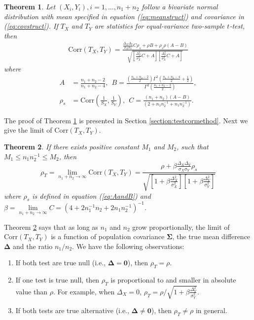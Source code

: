 \documentclass[12pt, a4paper]{article}
\newtheorem{theorem}{Theorem}       %
\newcommand{\cor}{\text{Corr}}
\begin{document}
	\begin{theorem}\label{thm:tstat}
		Let $(X_i, Y_i), i = 1, \ldots, n_1 + n_2$ follow a bivariate normal distribution with mean specified in equation (\ref{eq:meanstruct}) and covariance in (\ref{eq:covstruct}). If $T_X$ and $T_Y$ are statistics for equal-variance two-sample $t$-test, then 
		\begin{equation}\label{eq:ttestcor}
	\begin{aligned}
	 \cor(T_X, T_Y) =   
	 \frac{\frac{\Delta_X\Delta_Y}{\sigma_X\sigma_Y}C \rho_{s}+ \rho B
		+ \rho_{s}\rho(A-B)}{\sqrt{\left[ \frac{\Delta_X^2}{\sigma_X^2}C + A\right]\left[\frac{\Delta_Y^2}{\sigma_X^2}C +   A\right]}}
	\end{aligned}
		\end{equation}
	where 
			 \begin{equation}\label{eq:AandB}
			 	 \begin{aligned}
			 	 A & = \frac{n_1 + n_2-2}{n_1 + n_2-4}, ~~B =
			 	 \frac{(\frac{n_1 + n_2 -2}{2})\Gamma^2(\frac{n_1 + n_2 -4}{2} + \frac{1}{2})}{\Gamma^2(\frac{n_1+ n_2 -2}{2})}, \\
			 	 \rho_s & = \cor(\frac{1}{S_X}, \frac{1}{S_Y}), ~~ 
			 	 C = \frac{(n_1 + n_2)(A-B)}{(2 + n_1n_2^{-1} + n_1n_2^{-1})}.
			 	 \end{aligned}
			 \end{equation}	 
	\end{theorem}
	The proof of Theorem \ref{thm:tstat} is presented in Section \ref{section:testcormethod}. Next we give the limit of $\cor(T_X, T_Y)$.
	\begin{theorem}\label{thm:rholimit}
	  	If there exists positive constant $M_1$ and $M_2$, such that $M_1 \leq n_1n_2^{-1}\leq M_2$, then
	   \begin{equation}\label{eq:limitT}
	   \rho_T=\lim\limits_{n_1 + n_2 \rightarrow \infty} \cor(T_X, T_Y) = \frac{\rho +
	   	\beta\frac{\Delta_X\Delta_Y}{\sigma_X\sigma_Y}\rho_{s}}{\sqrt{  \left[ 1 +\beta\frac{\Delta_X^2}{\sigma_X^2}\right]\left[ 1 + \beta\frac{\Delta_Y^2}{\sigma_Y^2}\right]}}
	   \end{equation}
	   where $\rho_{s}$ is defined in equation (\ref{eq:AandB}) and $\beta = \lim\limits_{n_1 + n_2 \rightarrow \infty}C = (4 + 2n_1^{-1}n_2 + 2n_1n_2^{-1})^{-1}$.
	\end{theorem}
	Theorem \ref{thm:rholimit} says that as long as $n_1$ and $n_2$ grow proportionally, the limit of $\cor(T_X, T_Y)$ is a function of population covariance $\bm \Sigma$, the true mean difference $\bm \Delta$ and the ratio $n_1/n_2$. We have the following observations:
	\begin{enumerate}
		\item If both test are true null (i.e., $\bm \Delta = \bm 0$), then $\rho_T = \rho$.
		\item If one test is true null, then $\rho_T$ is proportional to and smaller in absolute value than $\rho$. For example, when $\Delta_X=0$, $\rho_T = \rho /\sqrt{1 + \beta \frac{\Delta_Y^2}{\sigma_Y^2}}$. 
		\item If both tests are true alternative (i.e., $\bm \Delta \neq \bm 0$), then $\rho_T\neq \rho$ in general.
	\end{enumerate}
	
\end{document}
